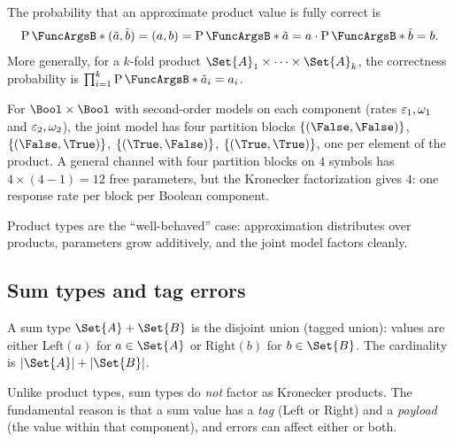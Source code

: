 \documentclass[ ../main.tex]{subfiles}
\begin{document}
\begin{corollary}
The probability that an approximate product value is fully correct is
\begin{equation}
\Prob{(\tilde{a}, \tilde{b}) = (a, b)} = \Prob{\tilde{a} = a} \cdot \Prob{\tilde{b} = b}.
\end{equation}
More generally, for a $k$-fold product $\Set{A}_1 \times \cdots \times \Set{A}_k$, the correctness probability is $\prod_{i=1}^{k} \Prob{\tilde{a}_i = a_i}$.
\end{corollary}

\begin{example}
\label{ex:bool_pair}
For $\Bool \times \Bool$ with second-order models on each component (rates $\varepsilon_1, \omega_1$ and $\varepsilon_2, \omega_2$), the joint model has four partition blocks $\{(\False,\False)\}$, $\{(\False,\True)\}$, $\{(\True,\False)\}$, $\{(\True,\True)\}$, one per element of the product.
A general channel with four partition blocks on $4$ symbols has $4 \times (4 - 1) = 12$ free parameters, but the Kronecker factorization gives $4$: one response rate per block per Boolean component.
\end{example}

Product types are the ``well-behaved'' case: approximation distributes over products, parameters grow additively, and the joint model factors cleanly.

\subsection{Sum types and tag errors}
\label{sec:sum}

A sum type $\Set{A} + \Set{B}$ is the disjoint union (tagged union): values are either $\mathrm{Left}(a)$ for $a \in \Set{A}$ or $\mathrm{Right}(b)$ for $b \in \Set{B}$.
The cardinality is $|\Set{A}| + |\Set{B}|$.

Unlike product types, sum types do \emph{not} factor as Kronecker products.
The fundamental reason is that a sum value has a \emph{tag} (Left or Right) and a \emph{payload} (the value within that component), and errors can affect either or both.
\end{document}
